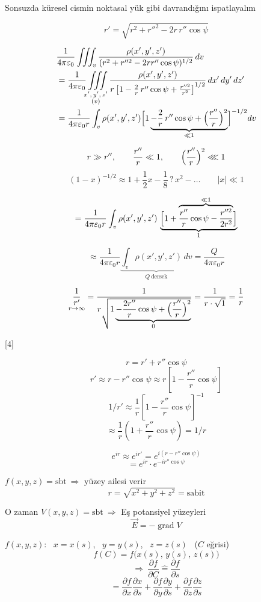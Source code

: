 \documentclass[11pt,a4paper]{article}
\begin{document}
\noindent Sonsuzda küresel cismin noktasal yük gibi davrandığını ispatlayalım

\[ r' = \sqrt{r^2 + r''^2 - 2r\,r''\cos\psi} \]

\begin{align*}
&\frac{1}{4\pi\varepsilon_0}\iiint_{v}\frac{\rho(x',y',z')}{(r^2 + r''^2 - 2rr''\cos\psi)^{1/2}}\,dv\\
&= \frac{1}{4\pi\varepsilon_0}\iiint\limits_{\substack{x',\,y',\,z'\\ (v)}}\frac{\rho(x',y',z')}{r\left[1 - \frac{2}{r}\,r''\cos\psi + \frac{r''^2}{r^2}\right]^{1/2}}\,dx'\,dy'\,dz'\\
&= \frac{1}{4\pi\varepsilon_0 r}\int_v \rho(x',y',z')\Bigl[1\underbrace{- \frac{2}{r}\,r''\cos\psi + \Bigl(\frac{r''}{r}\Bigr)^2}_{\ll 1}\Bigr]^{-1/2}dv
\end{align*}

\[ r \gg r'', \qquad \frac{r''}{r} \ll 1, \qquad \Bigl(\frac{r''}{r}\Bigr)^2 \lll 1 \]
\[ (1-x)^{-1/2} \approx 1 + \frac{1}{2}x - \frac{1}{8}\,?\,x^2 - \ldots \qquad |x| \ll 1 \]

\[ = \frac{1}{4\pi\varepsilon_0 r}\int_v \rho(x',y',z')\,\underbrace{\Bigl[1 + \overbrace{\frac{r''}{r}\cos\psi - \frac{r''^2}{2r^2}}^{\ll 1}\Bigr]}_{1} \]

\[ \approx \frac{1}{4\pi\varepsilon_0 r}\underbrace{\int_v \rho(x',y',z')\,dv}_{Q\ \text{dersek}} = \frac{Q}{4\pi\varepsilon_0 r} \]

\[ \underset{r\to\infty}{\frac{1}{r'}} = \frac{1}{r\sqrt{1\underbrace{-\frac{2r''}{r}\cos\psi + \Bigl(\frac{r''}{r}\Bigr)^2}_{0}}} = \frac{1}{r\cdot\sqrt{1}} = \frac{1}{r} \]

[4]

\[ r = r' + r''\cos\psi \]
\[ r' \approx r - r''\cos\psi \approx r\left[1 - \frac{r''}{r}\cos\psi\right] \]
\[ 1/r' \approx \frac{1}{r}\left[1 - \frac{r''}{r}\cos\psi\right]^{-1} \]
\[ \approx \frac{1}{r}\left(1 + \frac{r''}{r}\cos\psi\right) = 1/r \]

\[ e^{ir} \approx e^{ir'} = e^{i(r - r''\cos\psi)} \]
\[ = e^{ir}\cdot e^{-ir''\cos\psi} \]

\noindent $f(x,y,z) = \text{sbt} \ \Rightarrow$ yüzey ailesi verir
\[ r = \sqrt{x^2 + y^2 + z^2} = \text{sabit} \]

\noindent O zaman $V(x,y,z) = \text{sbt} \ \Rightarrow$ Eş potansiyel yüzeyleri
\[ \vec E = -\operatorname{grad}V \]

\noindent $f(x,y,z)$: \ $x = x(s)$, \ $y = y(s)$, \ $z = z(s)$ \ ($C$ eğrisi)
\[ f(C) = f\bigl(x(s),\,y(s),\,z(s)\bigr) \]
\[ \Rightarrow\ \frac{\partial f}{\partial C} \mathrel{\widehat{=}} \frac{\partial f}{\partial s} \]
\[ = \frac{\partial f}{\partial x}\frac{\partial x}{\partial s} + \frac{\partial f}{\partial y}\frac{\partial y}{\partial s} + \frac{\partial f}{\partial z}\frac{\partial z}{\partial s} \]
\end{document}
